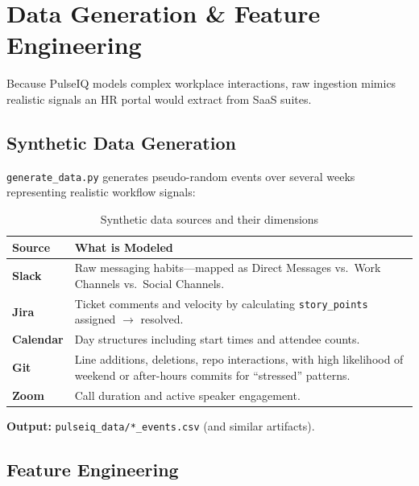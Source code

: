 \documentclass[12pt, a4paper, oneside]{report}
\begin{document}
\chapter{Data Generation \& Feature Engineering}
\label{ch:data}

Because PulseIQ models complex workplace interactions, raw ingestion mimics realistic signals an HR portal would extract from SaaS suites.

\section{Synthetic Data Generation}
\label{sec:synth}

\texttt{generate\_data.py} generates pseudo-random events over several weeks representing realistic workflow signals:

\begin{table}[H]
\centering
\caption{Synthetic data sources and their dimensions}
\label{tab:datasources}
\begin{tabular}{@{} l p{9cm} @{}}
\toprule
\textbf{Source} & \textbf{What is Modeled} \\
\midrule
\textbf{Slack}     & Raw messaging habits---mapped as Direct Messages vs.\ Work Channels vs.\ Social Channels. \\[4pt]
\textbf{Jira}      & Ticket comments and velocity by calculating \texttt{story\_points} assigned $\rightarrow$ resolved. \\[4pt]
\textbf{Calendar}  & Day structures including start times and attendee counts. \\[4pt]
\textbf{Git}       & Line additions, deletions, repo interactions, with high likelihood of weekend or after-hours commits for ``stressed'' patterns. \\[4pt]
\textbf{Zoom}      & Call duration and active speaker engagement. \\
\bottomrule
\end{tabular}
\end{table}

\textbf{Output:} \texttt{pulseiq\_data/*\_events.csv} (and similar artifacts).

\section{Feature Engineering}
\label{sec:featureeng}
\end{document}
